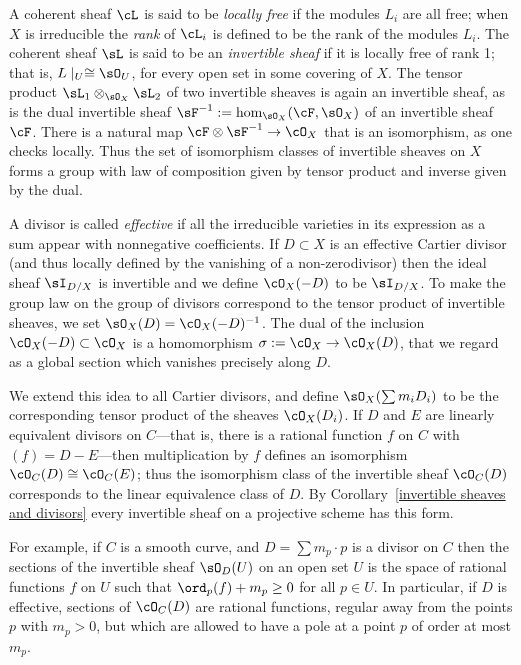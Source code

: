 A coherent sheaf $\cL$ is said to be \emph{locally free} if the modules $L_i$ are all free; when $X$ is irreducible the \emph{rank} of $\cL_i$ is defined to be the rank of the modules $L_i$.
The coherent sheaf $\sL$ is said to be an \emph{invertible sheaf} if it is locally free of rank 1; that is, $L\mid_U \cong \sO_U$,
for every open set in some covering of $X$. The tensor product  $\sL_1\otimes_{\sO_X}\sL_2$ of two invertible sheaves is  again an invertible sheaf, as is the dual invertible sheaf $\sF^{-1} := \hom_{\sO_X}(\cF,\sO_X)$ of an invertible sheaf $\cF$. There is a natural map
$\cF \otimes \sF^{-1} \to \cO_X$ that is an isomorphism, as one checks locally. Thus the set of isomorphism classes of invertible sheaves on $X$ forms a group with law of composition given by tensor product and inverse given by the dual.

A divisor is called \emph{effective} if all the irreducible varieties in its expression as a sum appear with nonnegative coefficients.
If $D\subset X$ is an effective Cartier divisor (and thus locally defined by the vanishing of a non-zerodivisor) then the ideal sheaf $\sI_{D/X}$
is invertible and we define $\cO_X(-D)$ to be $\sI_{D/X}$. To make the group law on the group of divisors correspond to the
tensor product of invertible sheaves, we set $\sO_X(D) =\cO_X(-D)^{-1}$. The dual of the inclusion
$\cO_X(-D) \subset \cO_X$ is a homomorphism $\sigma := \cO_X \to \cO_X(D)$, that we regard as a global section which
vanishes precisely along $D$. 

We extend this idea to all Cartier divisors, and define $\sO_X(\sum m_iD_i)$ to be the corresponding tensor
product of the sheaves $\cO_X(D_i)$. If $D$ and $E$ are linearly equivalent divisors on $C$---that is, there is a rational function $f$ on $C$ with $(f) = D - E$---then multiplication by $f$ defines an isomorphism $\cO_C(D) \cong \cO_C(E)$; thus the isomorphism class of the invertible sheaf $\cO_C(D)$ corresponds to the linear equivalence class of $D$. By Corollary~\ref{invertible sheaves and divisors} every invertible sheaf on a projective scheme has this form.

For example, if $C$ is a smooth curve, and $D = \sum m_p\cdot p$ is a divisor on $C$ then the sections of the invertible sheaf
$\sO_D(U)$ on an open set $U$ is the space of rational functions $f$ on $U$ such that $\ord_p(f) + m_p \geq 0$ for all $p \in U$. 
In particular, if $D$ is effective, sections of $\cO_C(D)$ are rational functions, regular away from the points $p$ with $m_p > 0$, but which are allowed to have a pole at a point $p$ of order at most $m_p$. 

